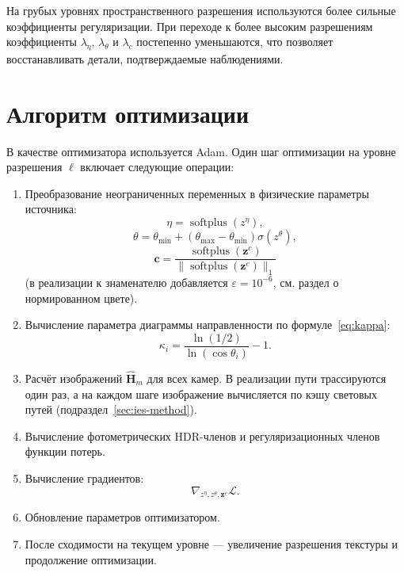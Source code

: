 На грубых уровнях пространственного разрешения используются более сильные коэффициенты регуляризации. При переходе к более высоким разрешениям коэффициенты $\lambda_\eta$, $\lambda_\theta$ и $\lambda_c$ постепенно уменьшаются, что позволяет восстанавливать детали, подтверждаемые наблюдениями.

\section{Алгоритм оптимизации}

В качестве оптимизатора используется Adam. Один шаг оптимизации на уровне разрешения $\ell$ включает следующие операции:
\begin{enumerate}
    \item Преобразование неограниченных переменных в физические параметры источника:
    \begin{equation}
    \eta=\operatorname{softplus}(z^\eta),
    \end{equation}
    \begin{equation}
    \theta=
    \theta_{\min}
    +(\theta_{\max}-\theta_{\min})\sigma(z^\theta),
    \end{equation}
    \begin{equation}
    \mathbf{c}=
    \frac{\operatorname{softplus}(\mathbf{z}^c)}
    {\|\operatorname{softplus}(\mathbf{z}^c)\|_1}
    \end{equation}
    (в реализации к знаменателю добавляется $\varepsilon=10^{-6}$, см. раздел о нормированном цвете).

    \item Вычисление параметра диаграммы направленности по формуле~\eqref{eq:kappa}:
    \begin{equation}
    \kappa_i
    =
    \frac{\ln(1/2)}{\ln(\cos\theta_i)}-1.
    \end{equation}

    \item Расчёт изображений $\hat{\mathbf{H}}_m$ для всех камер. В реализации пути трассируются один раз, а на каждом шаге изображение вычисляется по кэшу световых путей (подраздел~\ref{sec:ies-method}).

    \item Вычисление фотометрических HDR-членов и регуляризационных членов функции потерь.

    \item Вычисление градиентов:
    \begin{equation}
    \nabla_{z^\eta,z^\theta,\mathbf{z}^c}\mathcal{L}.
    \end{equation}

    \item Обновление параметров оптимизатором.

    \item После сходимости на текущем уровне --- увеличение разрешения текстуры и продолжение оптимизации.
\end{enumerate}

